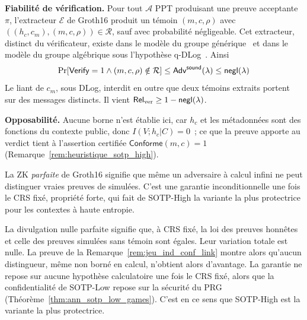 \begin{sloppypar}
\begin{Preuve}
\textbf{Fiabilit\'e de v\'erification.} Pour tout $\mathcal{A}$ PPT produisant une
preuve acceptante $\pi$, l'extracteur $\mathcal{E}$ de Groth16 produit un t\'emoin $(m,c,\rho)$ avec $((h_c,c_m),(m,c,\rho)) \in
\mathcal{R}$, sauf avec probabilit\'e n\'egligeable. Cet extracteur, distinct du v\'erificateur, existe dans le mod\`ele du groupe g\'en\'erique~\cite{Groth16} et dans le
mod\`ele du groupe alg\'ebrique sous l'hypoth\`ese q-DLog~\cite{FKL18}. Ainsi
\begin{equation}
\Pr\!\left[\mathsf{Verify}=1 \land (m,c,\rho)\notin\mathcal{R}\right]
\leq \mathsf{Adv}^{\mathsf{sound}}(\lambda) \leq \mathsf{negl}(\lambda)
\end{equation}
Le liant de $c_m$, sous DLog, interdit en outre que deux t\'emoins extraits portent sur
des messages distincts. Il vient $\mathsf{Rel}_{\mathrm{ver}} \geq 1-\mathsf{negl}(\lambda)$.

\textbf{Opposabilit\'e.} Aucune borne n'est \'etablie ici, car $h_c$ et les
m\'etadonn\'ees sont des fonctions du contexte public, donc $I(V;h_c|C) = 0$~; ce que
la preuve apporte au verdict tient \`a l'assertion certifi\'ee
$\mathsf{Conforme}(m,c) = 1$ (Remarque~\ref{rem:heuristique_sotp_high}).
\end{Preuve}

\begin{remark}[La ZK parfaite] La ZK \emph{parfaite}
de Groth16 signifie que m\^eme un adversaire \`a calcul infini ne peut
distinguer vraies preuves de simul\'ees. C'est une garantie inconditionnelle
une fois le CRS fix\'e, propri\'et\'e forte, qui fait de SOTP-High
la variante la plus protectrice pour les contextes \`a haute entropie.
\end{remark}

\begin{Preuve}
La divulgation nulle parfaite signifie que, \`a CRS fix\'e, la loi des preuves
honn\^etes et celle des preuves simul\'ees sans t\'emoin sont \'egales. Leur variation
totale est nulle. La preuve de la Remarque~\ref{rem:jeu_ind_conf_link} montre alors
qu'aucun distingueur, m\^eme non born\'e en calcul, n'obtient alors d'avantage. La
garantie ne repose sur aucune hypoth\`ese calculatoire une fois le CRS fix\'e,
alors que la confidentialit\'e de SOTP-Low repose sur la s\'ecurit\'e du PRG
(Th\'eor\`eme~\ref{thm:ann_sotp_low_games}). C'est en ce sens que SOTP-High est la
variante la plus protectrice.
\end{Preuve}
\end{sloppypar}

